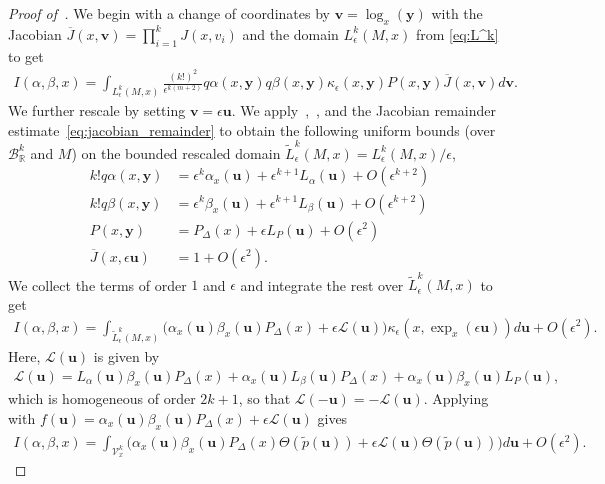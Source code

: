 \documentclass[11pt,reqno]{amsproc}
\numberwithin{equation}{section}
\newcommand{\R}{\mathbb{R}}
\newcommand{\by}{\mathbf{y}}
\newcommand{\bu}{\mathbf{u}}
\newcommand{\bv}{\mathbf{v}}
\newcommand{\cB}{\mathcal{B}}
\newcommand{\cL}{\mathcal{L}}
\newcommand{\cV}{\mathcal{V}}
\newcommand{\tp}{\tilde{p}}
\newcommand{\tL}{\widetilde{L}}
\theoremstyle{definition}
\theoremstyle{plain}
\begin{document}
    \begin{proof}[Proof of~]
        We begin with a change of coordinates by $\bv = \log_x(\by)$ with the Jacobian $\overline{J}(x, \bv) = \prod_{i=1}^k J(x,v_i)$ and the domain $L^k_\epsilon(M,x)$ from \eqref{eq:L^k} to get
        \begin{align}
            I(\alpha,\beta, x) = \int_{L^k_\epsilon(M,x)} \frac{(k!)^2}{\epsilon^{k(m+2)}} q\alpha(x,\by) q\beta(x,\by) \kappa_\epsilon(x,\by) P(x,\by) \overline{J}(x,\bv) d\bv.
        \end{align}
        We further rescale by setting $\bv = \epsilon \bu$. We apply~,~, and the Jacobian remainder estimate~\eqref{eq:jacobian_remainder} to obtain the following uniform bounds (over $\cB_\R^k$ and $M$) on the bounded rescaled domain $\tL^k_\epsilon(M,x) = L^k_\epsilon(M,x)/\epsilon$,
        \begin{align}
            k! q\alpha(x,\by) &= \epsilon^k\alpha_x(\bu) + \epsilon^{k+1}L_\alpha(\bu) + O(\epsilon^{k+2}) \\
            k! q\beta(x,\by) & = \epsilon^k\beta_x(\bu) + \epsilon^{k+1} L_\beta(\bu) + O(\epsilon^{k+2}) \\
            P(x,\by) & = P_\Delta(x) + \epsilon L_P(\bu) + O(\epsilon^2) \\
            \overline{J}(x,\epsilon\bu) &= 1 + O(\epsilon^2).
        \end{align}
        We collect the terms of order $1$ and $\epsilon$ and integrate the rest over $\tL^k_\epsilon(M,x)$ to get
        \begin{align}
            I(\alpha,\beta,x) =  \int_{\tL^k_\epsilon(M,x)} \Big(\alpha_x(\bu) \beta_x(\bu) P_\Delta(x) + \epsilon \cL(\bu) \Big)\kappa_\epsilon(x,\exp_x(\epsilon\bu))d\bu + O(\epsilon^{2}).
        \end{align}
        Here, $\cL(\bu)$ is given by
        \begin{align}
            \cL(\bu) = L_\alpha(\bu) \beta_x(\bu) P_\Delta(x) + \alpha_x(\bu) L_\beta(\bu) P_\Delta(x) + \alpha_x(\bu) \beta_x(\bu) L_P(\bu),
        \end{align}
        which is homogeneous of order $2k+1$, so that $\cL(-\bu) = -\cL(\bu)$.
        Applying~ with $f(\bu)=\alpha_x(\bu)\beta_x(\bu)P_\Delta(x)+\epsilon\cL(\bu)$ gives
        \begin{align} \label{eq:uc_I_expanded_integral}
            I(\alpha,\beta,x) =  \int_{\cV_x^k} \Big(\alpha_x(\bu) \beta_x(\bu) P_\Delta(x) \Theta(\tp(\bu)) + \epsilon \cL(\bu) \Theta(\tp(\bu)) \Big)d\bu + O(\epsilon^{2}).

\end{align}
\end{proof}
\end{document}
